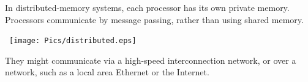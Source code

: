\documentclass[notes,color]{sepslide0}
\begin{document}

\begin{slide}

In distributed-memory systems, each processor has its own private memory.
Processors communicate by message passing, rather than using shared memory. 
%
\begin{center}
\ \texttt{[image: Pics/distributed.eps]}\ 
\end{center}
%
They might communicate via a high-speed interconnection network, or over a
network, such as a local area Ethernet or the Internet.
\end{slide}









\end{document}
